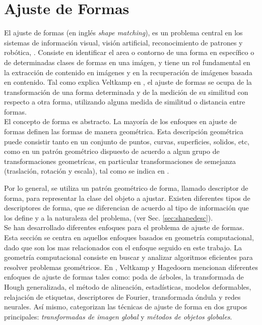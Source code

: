 \section{Ajuste de Formas}
\label{sec:shapefitting}

El ajuste de formas (en ingl\'es \emph{shape matching}), es un problema
central en los sistemas de informaci\'on visual, visi\'on artificial, 
reconocimiento de patrones y rob\'otica, \cite{matchingbook}. Consiste
en identificar el area o contorno de una forma en espec\'ifico o de determinadas 
clases de formas en una im\'agen, y tiene un rol fundamental en la extracci\'on
de contenido en im\'agenes y en la recuperaci\'on de im\'agenes basada en contenido.
Tal como explica Veltkamp en \cite{matching2}, el ajuste de formas 
se ocupa de la transformaci\'on de una forma determinada y de la
medici\'on de su similitud con respecto a otra forma, utilizando
alguna medida de similitud o distancia entre formas.\\

El concepto de forma es abstracto. La mayor\'ia de los
enfoques en ajuste de formas definen las formas de manera 
geom\'etrica. Esta descripci\'on geom\'etrica puede 
consistir tanto en un conjunto de puntos, curvas, superficies,
solidos, etc, como en un patr\'on geom\'etrico dispuesto de acuerdo
a algun grupo de transformaciones geometr\'icas, en particular transformaciones
de semejanza (traslaci\'on, rotaci\'on y escala), tal como se indica en
\cite{matching2}. 

Por lo general, se utiliza un patr\'on geom\'etrico de forma, llamado
descriptor de forma, para representar la clase del objeto a ajustar.
Existen diferentes tipos de descriptores de forma, que se diferencian de acuerdo
al tipo de informaci\'on que los define y a la naturaleza del problema, (ver
Sec. \ref{sec:shapedesc}).\\

Se han desarrollado diferentes enfoques para el problema de ajuste de formas.
Esta secci\'on se centra en aquellos enfoques basados en geometr\'ia
computacional, dado que son los mas relacionados con el enfoque
seguido en este trabajo. La geometr\'ia computacional consiste en buscar y 
analizar algoritmos eficientes para resolver problemas geom\'etricos.
En \cite{matchingbook}, Veltkamp y Hagedoorn mencionan diferentes
enfoques de ajuste de formas tales como: poda de \'arboles, la transformada
de Hough generalizada, el m\'etodo de alineaci\'on, estad\'isticas,
modelos deformables, relajaci\'on de etiquetas, descriptores de Fourier,
transformada \'ondula y redes neurales. As\'i mismo, categorizan las 
t\'ecnicas de ajuste de forma en dos grupos principales:
\emph{transformadas de imagen global} y \emph{m\'etodos de objetos globales}.\\

